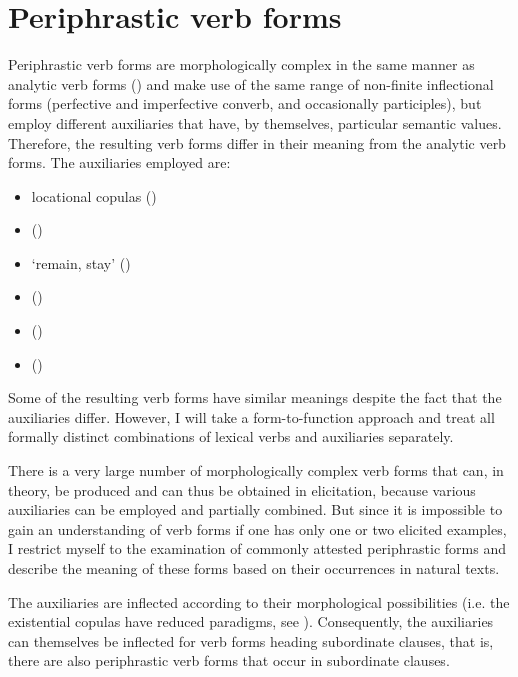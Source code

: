 \chapter{Periphrastic verb forms}
\label{cpt:Periphrastic verb forms}

Periphrastic verb forms are morphologically complex in the same manner as analytic verb forms () and make use of the same range of non-finite inflectional forms (perfective and imperfective converb, and occasionally participles), but employ different auxiliaries that have, by themselves, particular semantic values. Therefore, the resulting verb forms differ in their meaning from the analytic verb forms. The auxiliaries employed are:
%
\begin{itemize}
	\item	locational copulas ()
	\item	{}  ()
	\item	{} `remain, stay' ()
	\item	{}  ()
	\item	{}  ()
	\item	{}  ()
\end{itemize}

Some of the resulting verb forms have similar meanings despite the fact that the auxiliaries differ. However, I will take a form-to-function approach and treat all formally distinct combinations of lexical verbs and auxiliaries separately.

There is a very large number of morphologically complex verb forms that can, in theory, be produced and can thus be obtained in elicitation, because various auxiliaries can be employed and partially combined. But since it is impossible to gain an understanding of verb forms if one has only one or two elicited examples, I restrict myself to the examination of commonly attested periphrastic forms and describe the meaning of these forms based on their occurrences in natural texts.

The auxiliaries are inflected according to their morphological possibilities (i.e. the existential copulas have reduced paradigms, see ). Consequently, the auxiliaries can themselves be inflected for verb forms heading subordinate clauses, that is, there are also periphrastic verb forms that occur in subordinate clauses.


